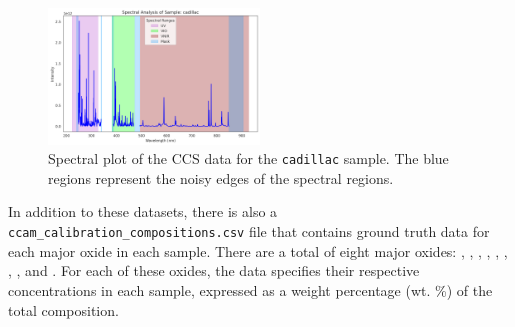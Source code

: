 \begin{figure}
	\centering
	\includegraphics[width=0.5\textwidth]{images/masked_regions.png}
	\caption{Spectral plot of the CCS data for the \texttt{cadillac} sample. The blue regions represent the noisy edges of the spectral regions.}
	\label{fig:masked_regions}
\end{figure}

In addition to these datasets, there is also a \\ \texttt{ccam\_calibration\_compositions.csv} file that contains ground truth data for each major oxide in each sample.
There are a total of eight major oxides: , , , , , , , , and .
For each of these oxides, the data specifies their respective concentrations in each sample, expressed as a weight percentage (wt. \%) of the total composition.